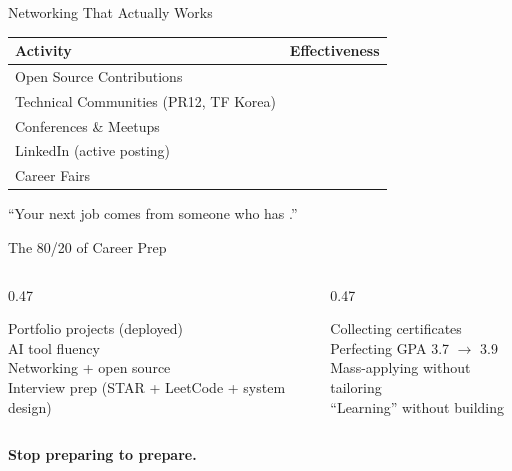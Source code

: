 \begin{frame}{Networking That Actually Works}
\vspace{0.3em}
\begin{tabular}{p{6.0cm} l}
  \toprule
  \textbf{Activity} & \textbf{Effectiveness} \\
  \midrule
  Open Source Contributions  & \positive{$\bigstar\bigstar\bigstar\bigstar\bigstar$} \\[3pt]
  Technical Communities (PR12, TF Korea) & \positive{$\bigstar\bigstar\bigstar\bigstar$} \\[3pt]
  Conferences \& Meetups     & \higold{$\bigstar\bigstar\bigstar$} \\[3pt]
  LinkedIn (active posting)  & \neutral{$\bigstar\bigstar$} \\[3pt]
  Career Fairs               & \neutral{$\bigstar$} \\
  \bottomrule
\end{tabular}
\vspace{0.8em}
\begin{keybox}[]
  \centering
  \small ``Your next job comes from someone who has .''
\end{keybox}
\end{frame}

\begin{frame}{The 80/20 of Career Prep}
\begin{columns}[T]
  \begin{column}{0.47\textwidth}
    \begin{keybox}
      \footnotesize
      \positive{\checkmark} Portfolio projects (deployed)\\[3pt]
      \positive{\checkmark} AI tool fluency\\[3pt]
      \positive{\checkmark} Networking + open source\\[3pt]
      \positive{\checkmark} Interview prep (STAR + LeetCode + system design)
    \end{keybox}
  \end{column}
  \begin{column}{0.47\textwidth}
    \begin{highlightbox}
      \footnotesize
      \negative{$\times$} Collecting certificates\\[3pt]
      \negative{$\times$} Perfecting GPA 3.7 $\rightarrow$ 3.9\\[3pt]
      \negative{$\times$} Mass-applying without tailoring\\[3pt]
      \negative{$\times$} ``Learning'' without building
    \end{highlightbox}
  \end{column}
\end{columns}
\vspace{0.8em}
\begin{center}
  {\normalsize\bfseries Stop preparing to prepare.\ }
\end{center}
\end{frame}

